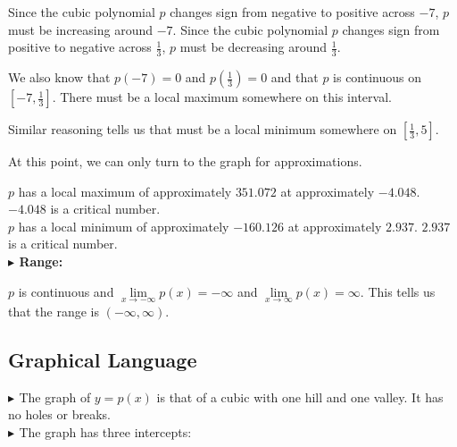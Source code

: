 \documentclass{ximera}
\begin{document}
\begin{exercise}
Since the cubic polynomial $p$ changes sign from negative to positive across $-7$, $p$ must be increasing around $-7$. Since the cubic polynomial $p$ changes sign from positive to negative across $\frac{1}{3}$, $p$ must be decreasing around $\frac{1}{3}$. 


We also know that $p(-7) = 0$ and $p\left( \frac{1}{3} \right) = 0$ and that $p$ is continuous on $\left[-7, \frac{1}{3}  \right]$.  There must be a local maximum somewhere on this interval.


Similar reasoning tells us that must be a local minimum somewhere on $\left[ \frac{1}{3}, 5 \right]$.





At this point, we can only turn to the graph for approximations.



$p$ has a local maximum of approximately $351.072$ at approximately $-4.048$.  $-4.048$ is a critical number. \\





$p$ has a local minimum of approximately $-160.126$ at approximately $2.937$.  $2.937$ is a critical number. \\









\textbf{\textcolor{blue!55!black}{$\blacktriangleright$ Range: }}


$p$ is continuous and  $\lim\limits_{x \to -\infty} p(x) = -\infty$  and $\lim\limits_{x \to \infty} p(x) = \infty$.  This tells us that the range is $(-\infty, \infty)$.








\subsection{Graphical Language}







\textbf{\textcolor{blue!55!black}{$\blacktriangleright$ }}  The graph of $y = p(x)$ is that of a cubic with one hill and one valley. It has no holes or breaks. \\

\textbf{\textcolor{blue!55!black}{$\blacktriangleright$ }}  The graph has three intercepts:



\end{exercise}
\end{document}
